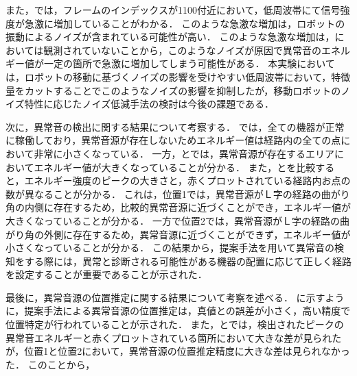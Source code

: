 \documentclass[../main]{subfiles}
\begin{document}
また，では，フレームのインデックスが1100付近において，低周波帯にて信号強度が急激に増加していることがわかる．
このような急激な増加は，ロボットの振動によるノイズが含まれている可能性が高い．
このような急激な増加は，においては観測されていないことから，このようなノイズが原因で異常音のエネルギー値が一定の箇所で急激に増加してしまう可能性がある．
本実験においては，ロボットの移動に基づくノイズの影響を受けやすい低周波帯において，特徴量をカットすることでこのようなノイズの影響を抑制したが，移動ロボットのノイズ特性に応じたノイズ低減手法の検討は今後の課題である．

次に，異常音の検出に関する結果について考察する．
では，全ての機器が正常に稼働しており，異常音源が存在しないためエネルギー値は経路内の全ての点において非常に小さくなっている．
一方，とでは，異常音源が存在するエリアにおいてエネルギー値が大きくなっていることが分かる．
また，とを比較すると，エネルギー強度のピークの大きさと，赤くプロットされている経路内お点の数が異なることが分かる．
これは，位置1では，異常音源がＬ字の経路の曲がり角の内側に存在するため，比較的異常音源に近づくことができ，エネルギー値が大きくなっていることが分かる．
一方で位置2では，異常音源がＬ字の経路の曲がり角の外側に存在するため，異常音源に近づくことができず，エネルギー値が小さくなっていることが分かる．
この結果から，提案手法を用いて異常音の検知をする際には，異常と診断される可能性がある機器の配置に応じて正しく経路を設定することが重要であることが示された．


最後に，異常音源の位置推定に関する結果について考察を述べる．
に示すように，提案手法による異常音源の位置推定は，真値との誤差が小さく，高い精度で位置特定が行われていることが示された．
また，とでは，検出されたピークの異常音エネルギーと赤くプロットされている箇所において大きな差が見られたが，位置1と位置2において，異常音源の位置推定精度に大きな差は見られなかった．
このことから，
\end{document}
